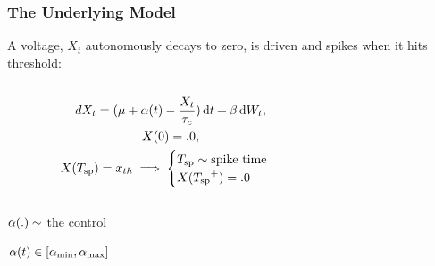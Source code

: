 \documentclass{beamer}
\begin{document}
\begin{frame}
\frametitle{The Underlying Model}
A voltage, $X_t$ autonomously decays to zero, is driven and spikes when it hits
threshold:
\begin{columns}[T]
\begin{column}{5cm}
\begin{equation*}
\begin{gathered}
dX_t = ({\mu } + {\alpha}(t) - \frac{X_t}{{ \tau_{c} }} ) \, \mathrm{d} t + {\beta} \, \mathrm{d} W_t,
\\
X(0) = .0,
\\
X({ T_{\textrm{sp} } }) = { x_{th} } \implies
\begin{cases}
{ T_{\textrm{sp} } } \sim \text{spike time} 
\\
X({ T_{\textrm{sp} } }^+) = .0 &
\end{cases}
\end{gathered}
\end{equation*}
\end{column}
\begin{column}{5cm} 
\end{column}
\end{columns}

\pause
\begin{center}
${\alpha}(.) \sim$ the control

${\alpha}(t)\in [{ {\alpha}_{\textrm{min}} },{ {\alpha}_{\textrm{max}} }]$
\end{center}


\end{frame}
\end{document}
